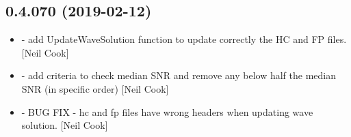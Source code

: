 \documentclass[a4paper,10pt,english]{report}
\begin{document}
\subsection{0.4.070 (2019-02-12)}
\label{\detokenize{misc/changelog:id187}}\begin{itemize}
\item {} 
 - add UpdateWaveSolution  function to
update correctly the HC and FP files. {[}Neil Cook{]}

\item {} 
 - add criteria to check median SNR and remove
any below half the median SNR (in specific order) {[}Neil Cook{]}

\item {} 
 - BUG FIX - hc and fp files have wrong
headers when updating wave solution. {[}Neil Cook{]}

\end{itemize}
\end{document}
